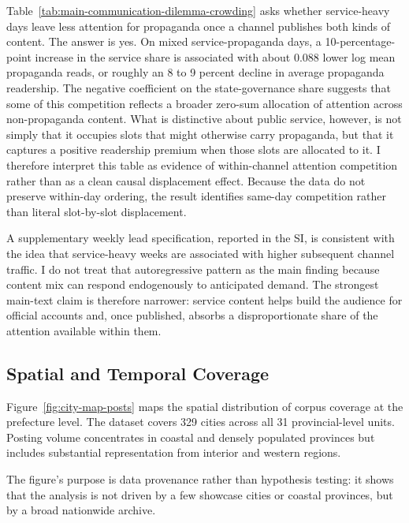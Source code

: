 \documentclass[12pt, american]{article}
\begin{document}
\begin{refsection}
Table~\ref{tab:main-communication-dilemma-crowding} asks whether service-heavy days leave less attention for propaganda once a channel publishes both kinds of content. The answer is yes. On mixed service-propaganda days, a 10-percentage-point increase in the service share is associated with about 0.088 lower log mean propaganda reads, or roughly an 8 to 9 percent decline in average propaganda readership. The negative coefficient on the state-governance share suggests that some of this competition reflects a broader zero-sum allocation of attention across non-propaganda content. What is distinctive about public service, however, is not simply that it occupies slots that might otherwise carry propaganda, but that it captures a positive readership premium when those slots are allocated to it. I therefore interpret this table as evidence of within-channel attention competition rather than as a clean causal displacement effect. Because the data do not preserve within-day ordering, the result identifies same-day competition rather than literal slot-by-slot displacement.



A supplementary weekly lead specification, reported in the SI, is consistent with the idea that service-heavy weeks are associated with higher subsequent channel traffic. I do not treat that autoregressive pattern as the main finding because content mix can respond endogenously to anticipated demand. The strongest main-text claim is therefore narrower: service content helps build the audience for official accounts and, once published, absorbs a disproportionate share of the attention available within them.

\subsection{Spatial and Temporal Coverage}

Figure~\ref{fig:city-map-posts} maps the spatial distribution of corpus coverage at the prefecture level. The dataset covers 329 cities across all 31 provincial-level units. Posting volume concentrates in coastal and densely populated provinces but includes substantial representation from interior and western regions.

The figure's purpose is data provenance rather than hypothesis testing: it shows that the analysis is not driven by a few showcase cities or coastal provinces, but by a broad nationwide archive.


\end{refsection}
\end{document}
